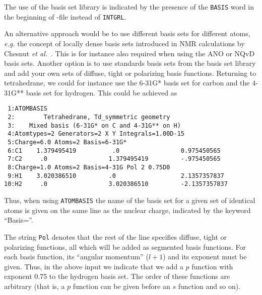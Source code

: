 The use of the basis set library is indicated by the presence of the
\verb|BASIS| word in the beginning of \mol-file instead of
\verb|INTGRL|.

An alternative approach would be to use different basis sets for
different atoms, {\it e.g.\/} the concept of locally
dense basis sets
introduced in NMR calculations by Chesnut {\it et
al.\/}~\cite{dbcberkdmdaejcc14}. This is for instance also required
when using the ANO or
NQvD
basis sets. Another option is to use
standards basis sets from the basis set 
library and add your own sets
of diffuse, tight or polarizing basis
functions. Returning to
tetrahedrane, we could for instance use the 6-31G* basis set for
carbon and the 4-31G** basis set for hydrogen. This could be achieved
as

\begin{verbatim}
 1:ATOMBASIS
 2:        Tetrahedrane, Td_symmetric geometry
 3:    Mixed basis (6-31G* on C and 4-31G** on H)
 4:Atomtypes=2 Generators=2 X Y Integrals=1.00D-15
 5:Charge=6.0 Atoms=2 Basis=6-31G*
 6:C1    1.379495419          .0                 0.975450565
 7:C2     .0                 1.379495419         -.975450565
 8:Charge=1.0 Atoms=2 Basis=4-31G Pol 2 0.75D0
 9:H1    3.020386510         .0                  2.1357357837
10:H2     .0                 3.020386510         -2.1357357837
\end{verbatim}


Thus, when using {\tt ATOMBASIS} the name of the
basis set for a given
set of identical atoms is given on the same line as the nuclear
charge, indicated by the keyword ``Basis=''.

The string {\tt Pol} denotes that the rest of the line specifies
diffuse, tight or polarizing
functions, all which will be added as segmented basis functions.
For each basis function, its ``angular momentum'' ($l+1$) and its
exponent must be given. Thus, in the above input we indicate that
we add a $p$ function with exponent 0.75 to the hydrogen basis
set. The order of these functions are arbitrary (that is, a $p$
function can be given before an $s$ function and so on).

